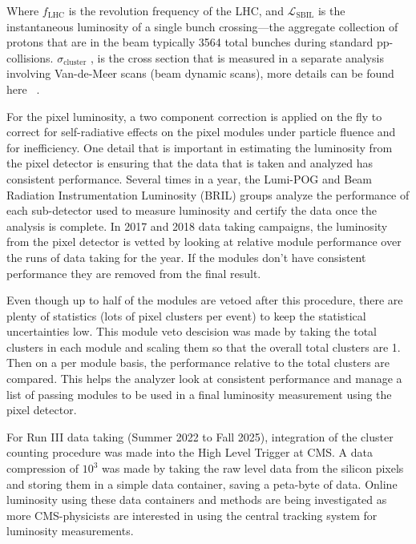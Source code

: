 Where $f_{\text{LHC}}$ is the revolution frequency of the LHC, and $\mathcal{L}_{\text{SBIL}}$ is the instantaneous luminosity of a single bunch crossing---the aggregate collection of protons that are in the beam typically 3564 total bunches during standard pp-collisions. $\sigma_{\text{cluster}}$ , is the cross section that is measured in a separate analysis involving Van-de-Meer scans (beam dynamic scans), more details can be found here ~\cite{Knolle:2792593}. 



For the pixel luminosity, a two component correction is applied on the fly to correct for self-radiative effects on the pixel modules under particle fluence and for inefficiency.  
One detail that is important in estimating the luminosity from the pixel detector is ensuring that the data that is taken and analyzed has consistent performance. Several times in a year, the Lumi-POG and Beam Radiation Instrumentation Luminosity (BRIL) groups analyze the performance of each sub-detector used to measure luminosity and certify the data once the analysis is complete. In 2017 and 2018 data taking campaigns, the luminosity from the pixel detector is vetted by looking at relative module performance over the runs of data taking for the year. If the modules don't have consistent performance they are removed from the final result. 

Even though up to half of the modules are vetoed after this procedure, there are plenty of statistics (lots of pixel clusters per event) to keep the statistical uncertainties low. 
This module veto descision was made by taking the total clusters in each module and scaling them so that the overall total clusters are 1. Then on a per module basis, the performance relative to the total clusters are compared. This helps the analyzer look at consistent performance and manage a list of passing modules to be used in a final luminosity measurement using the pixel detector. 

For Run III data taking (Summer 2022 to Fall 2025), integration of the cluster counting procedure was made into the High Level Trigger at CMS. A data compression of $10^3$ was made by taking the raw level data from the silicon pixels and storing them in a simple data container, saving a peta-byte of data. Online luminosity using these data containers and methods are being investigated as more CMS-physicists are interested in using the central tracking system for luminosity measurements.





